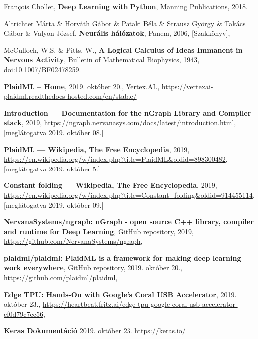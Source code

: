 \begin{thebibliography}{9}
	François Chollet,
	\textbf{Deep Learning with Python},
	Manning Publications,
	2018.

	Altrichter Márta \& Horváth Gábor \& Pataki Béla \& Strausz György \& Takács Gábor \& Valyon József,
	\textbf{Neurális hálózatok},
	Panem,
	2006,
	[Szakkönyv],

McCulloch, W.S. \& Pitts, W.,
\textbf{A Logical Calculus of Ideas Immanent in Nervous Activity},
Bulletin of Mathematical Biophysics,
1943,
doi:10.1007/BF02478259.




\textbf{PlaidML -- Home},
2019. október 20.,
Vertex.AI.,
\newline\url{https://vertexai-plaidml.readthedocs-hosted.com/en/stable/}

\textbf{Introduction --- Documentation for the {nGraph} Library and Compiler stack},
2019,
\newline\url{https://ngraph.nervanasys.com/docs/latest/introduction.html},
[meglátogatva 2019. október 08.]


	\textbf{PlaidML --- {Wikipedia}{,} The Free Encyclopedia},
	2019,
	\newline\url{https://en.wikipedia.org/w/index.php?title=PlaidML&oldid=898300482},
	[meglátogatva 2019. október 5.]


	\textbf{Constant folding --- {Wikipedia}{,} The Free Encyclopedia},
	2019,
	\newline\url{https://en.wikipedia.org/w/index.php?title=Constant_folding&oldid=914455114},
	[meglátogatva 2019. október 09.]


	\textbf{NervanaSystems/ngraph: nGraph - open source C++ library, compiler and runtime for Deep Learning},
	GitHub repository,
	2019,
	\newline\url{https://github.com/NervanaSystems/ngraph},


	\textbf{plaidml/plaidml: PlaidML is a framework for making deep learning work everywhere},
	GitHub repository,
	2019. október 20.,
	\newline\url{https://github.com/plaidml/plaidml},



	\textbf{Edge TPU: Hands-On with Google’s Coral USB Accelerator},
	2019. október 23.,
	\newline\url{https://heartbeat.fritz.ai/edge-tpu-google-coral-usb-accelerator-cf0d79c7ec56},

	\textbf{Keras Dokumentáció}
	2019. október 23.
	\newline\url{https://keras.io/}

\end{thebibliography}